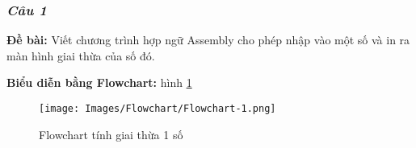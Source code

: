 \subsubsection{\textit{Câu 1}}

\noindent\textbf{\large Đề bài:} Viết chương trình hợp ngữ Assembly cho phép nhập vào một số và in ra màn hình giai thừa của số đó.

\vspace{0.5cm}
\noindent\textbf{\large Biểu diễn bằng Flowchart:} hình \ref{fig:flowchart-1}

\begin{figure}[H]
    \centering
    \texttt{[image: Images/Flowchart/Flowchart-1.png]}
    \caption{Flowchart tính giai thừa 1 số}
    \label{fig:flowchart-1}
\end{figure}

